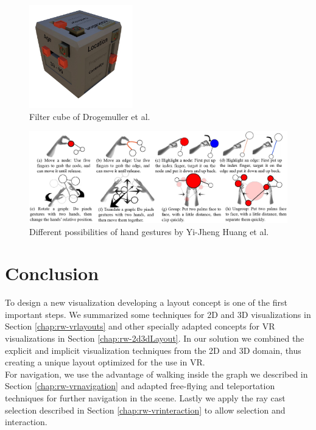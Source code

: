 \begin{figure}[h]
    \centering
    \includegraphics[width=0.4\textwidth]{graphics/filterCube.jpg}
    \caption{Filter cube of Drogemuller et al. \cite{drogemuller_vrige_2017}} 
    \label{fig:vrFilterCube} 
\end{figure}

\begin{figure}[h]
    \centering
    \includegraphics[width=1\textwidth]{graphics/handGestures.jpg}
    \caption{Different possibilities of hand gestures by Yi-Jheng Huang et al. \cite{yi-jheng_huang_gesture_2017}} 
    \label{fig:vrHandGestures} 
\end{figure}

\section{Conclusion}

To design a new visualization developing a layout concept is one of the first important steps. We summarized some techniques for 2D and 3D visualizations in Section \ref{chap:rw-vrlayouts} and other specially adapted concepts for VR visualizations in Section \ref{chap:rw-2d3dLayout}. In our solution we combined the explicit and implicit visualization techniques from the 2D and 3D domain, thus creating a unique layout optimized for the use in VR.\\
For navigation, we use the advantage of walking inside the graph we described in Section \ref{chap:rw-vrnavigation} and adapted free-flying and teleportation techniques for further navigation in the scene. Lastly we apply the ray cast selection described in Section \ref{chap:rw-vrinteraction} to allow selection and interaction.  